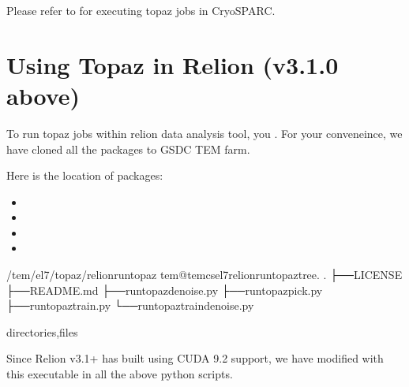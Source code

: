 \documentclass[a4paper,11pt,english]{sphinxmanual}
\begin{document}
\sphinxAtStartPar
Please refer to  for executing topaz jobs in CryoSPARC.


\section{Using Topaz in Relion (v3.1.0 above)}
\label{\detokenize{topaz:using-topaz-in-relion-v3-1-0-above}}
\sphinxAtStartPar
To run topaz jobs within relion data analysis tool, you . For your conveneince, we have cloned all the  packages to GSDC TEM farm.

\sphinxAtStartPar
Here is the location of  packages:
\begin{itemize}
\item {} 
\sphinxAtStartPar
{}

\item {} 
\sphinxAtStartPar
{}

\item {} 
\sphinxAtStartPar
{}

\item {} 
\sphinxAtStartPar
{}

\end{itemize}

\begin{sphinxVerbatim}[commandchars=\\\{\}]
\PYGZdl{}\PYGZgt{}
/tem/el7/topaz/relion\PYGZus{}run\PYGZus{}topaz
\PYG{o}{[}tem@tem\PYGZhy{}cs\PYGZhy{}el7relion\PYGZus{}run\PYGZus{}topaz\PYG{o}{]}\PYGZdl{}tree.
.
├──LICENSE
├──README.md
├──run\PYGZus{}topaz\PYGZus{}denoise.py
├──run\PYGZus{}topaz\PYGZus{}pick.py
├──run\PYGZus{}topaz\PYGZus{}train.py
└──run\PYGZus{}topaz\PYGZus{}train\PYGZus{}denoise.py

directories,files
\end{sphinxVerbatim}

\sphinxAtStartPar
Since Relion v3.1+ has built using CUDA 9.2 support, we have modified  with this executable  in all the above python scripts.
\end{document}
